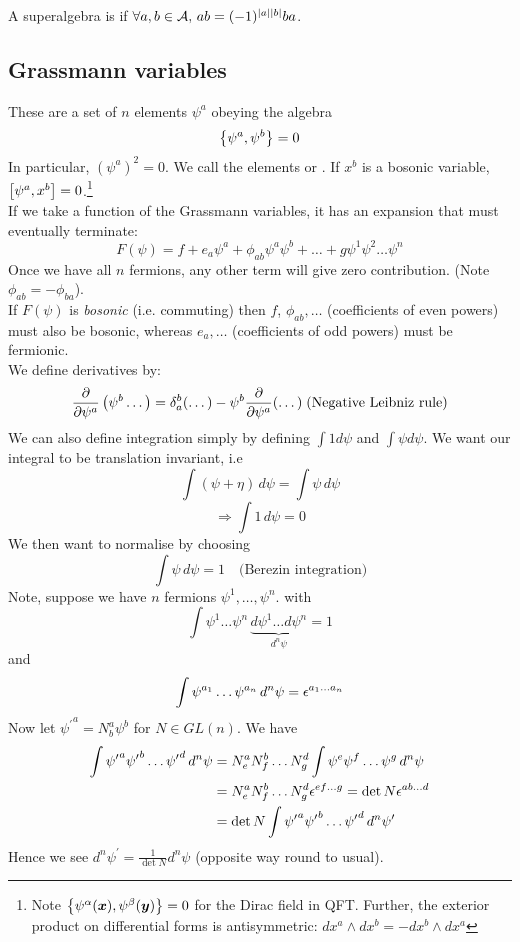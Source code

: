 \documentclass{article}
\begin{document}
\begin{definition}
	A superalgebra is  if $\forall a,b \in \mc{A}, \, ab = (-1)^{\abs{a}\abs{b}}ba$.
\end{definition}
\subsection{Grassmann variables}
These are a set of $n$ elements $\psi^a$ obeying the algebra 
\[
\acomm[\psi^a]{\psi^b} = 0
\]
In particular, $(\psi^a)^2=0$. We call the elements  or . If $x^b$ is a bosonic variable, $\comm[\psi^a]{x^b}=0$.\footnote{Note $\acomm[\psi^\alpha(\bm{x})]{\psi^\beta(\bm{y})} = 0$ for the Dirac field in QFT. Further, the exterior product on differential forms is antisymmetric: $dx^a \wedge dx^b = -dx^b \wedge dx^a$} \\
If we take a function of the Grassmann variables, it has an expansion that must eventually terminate: 
\[
F(\psi) = f + e_a \psi^a + \phi_{ab} \psi^a \psi^b + \dots +g \psi^1\psi^2\dots\psi^n
\]
Once we have all $n$ fermions, any other term will give zero contribution. (Note $\phi_{ab} = -\phi_{ba}$). \\
If $F(\psi)$ is \emph{bosonic} (i.e. commuting) then $f$, $\phi_{ab},\dots$ (coefficients of even powers) must also be bosonic, whereas $e_a,\dots$ (coefficients of odd powers) must be fermionic. \\
We define derivatives by:
\[
\pd{\psi^a}\left(\psi^b \dots \right) = \delta^b_a ( \dots) - \psi^b \pd{\psi^a} (\dots) \; \text{(Negative Leibniz rule)}
\]
We can also define integration simply by defining $\int 1 d\psi$ and $\int \psi d\psi$. We want our integral to be translation invariant, i.e 
\[
\int (\psi + \eta) \, d\psi = \int \psi \, d\psi
\]
\[
\Rightarrow \int 1 \, d\psi = 0 
\]
We then want to normalise by choosing 
\[
\int \psi \, d\psi = 1 \quad \text{(Berezin integration)}
\]
Note, suppose we have $n$ fermions $\psi^1, \dots, \psi^n$. with 
\[
\int \psi^1 \dots \psi^n \, \underbrace{ d\psi^1 \dots d\psi^n}_{d^n \psi} = 1 
\]
and 
\[
\int \psi^{a_1} \dots \psi^{a_n} \, d^n \psi = \eps^{a_1 \dots a_n}
\]
Now let ${\psi^\prime}^a=N^a_b \psi^b$ for $N\in GL(n)$. We have 
\begin{align*}
    \int {\psi^\prime}^a {\psi^\prime}^b \dots {\psi^\prime}^d \, d^n \psi &= N^a_e N^b_f \dots N^d_g \int \psi^e \psi^f \dots \psi^g \, d^n \psi \\
    &= N^a_e N^b_f \dots N^d_g \eps^{ef\dots g} = \det N \eps^{ab\dots d} \\
    &= \det N \int {\psi^\prime}^a {\psi^\prime}^b \dots {\psi^\prime}^d \, d^n \psi^\prime 
\end{align*}
Hence we see $d^n \psi^\prime = \frac{1}{\det N} d^n \psi$ (opposite way round to usual).
\end{document}
